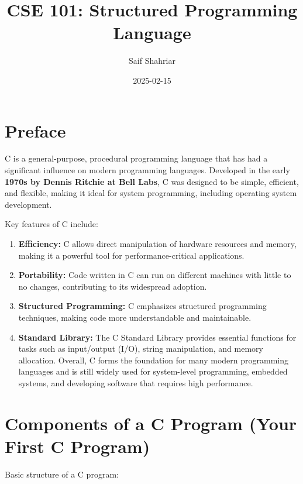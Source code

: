 \documentclass[
]{article}
\title{CSE 101: Structured Programming Language}
\author{Saif Shahriar}
\date{2025-02-15}
\providecommand{\tightlist}{%
  \setlength{\itemsep}{0pt}\setlength{\parskip}{0pt}}
\begin{document}
\maketitle

\tableofcontents

\newpage

\hypertarget{preface}{%
\section{Preface}\label{preface}}

C is a general-purpose, procedural programming language that has had a
significant influence on modern programming languages. Developed in the
early \textbf{1970s by Dennis Ritchie at Bell Labs}, C was designed to
be simple, efficient, and flexible, making it ideal for system
programming, including operating system development.

Key features of C include:

\begin{enumerate}
\def\labelenumi{\arabic{enumi}.}
\tightlist
\item
  \textbf{Efficiency:} C allows direct manipulation of hardware
  resources and memory, making it a powerful tool for
  performance-critical applications.
\item
  \textbf{Portability:} Code written in C can run on different machines
  with little to no changes, contributing to its widespread adoption.
\item
  \textbf{Structured Programming:} C emphasizes structured programming
  techniques, making code more understandable and maintainable.
\item
  \textbf{Standard Library:} The C Standard Library provides essential
  functions for tasks such as input/output (I/O), string manipulation,
  and memory allocation. Overall, C forms the foundation for many modern
  programming languages and is still widely used for system-level
  programming, embedded systems, and developing software that requires
  high performance.
\end{enumerate}

\hypertarget{components-of-a-c-program-your-first-c-program}{%
\section{Components of a C Program (Your First C
Program)}\label{components-of-a-c-program-your-first-c-program}}

Basic structure of a C program:
\end{document}
